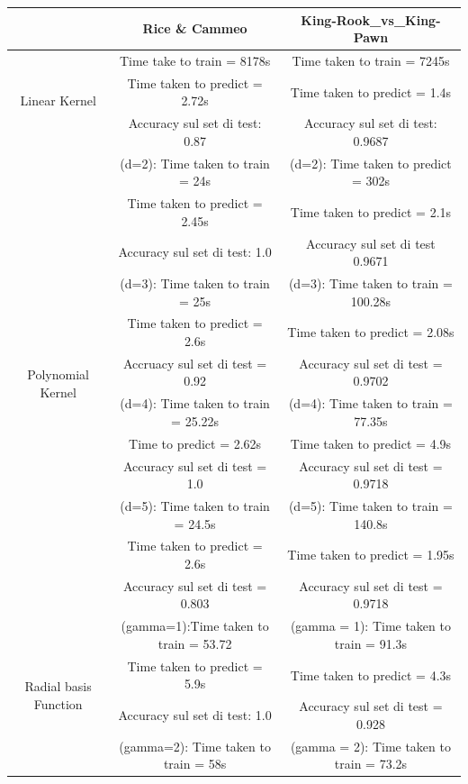\documentclass{article}
\begin{document}
  \begin{table}[htbp]
	\centering
	\begin{tabular}{|c|c|c|}
	  \hline
	  \multicolumn{1}{|c|}{} & \multicolumn{1}{c|}{Rice \& Cammeo} & \multicolumn{1}{c|}{King-Rook\_vs\_King-Pawn} \\
	  \hline
	  \multirow{3}{*}{Linear Kernel} & Time take to train = 8178s   & Time taken to train = 7245s\\
	  & Time taken to predict = 2.72s & Time taken to predict = 1.4s\\
	  & Accuracy sul set di test: 0.87 & Accuracy sul set di test: 0.9687\\
	  \hline
	  \multirow{12}{*}{Polynomial Kernel} & (d=2): Time taken to train = 24s & (d=2): Time taken to predict = 302s \\
	  & Time taken to predict = 2.45s & Time taken to predict = 2.1s\\
	  & Accuracy sul set di test: 1.0 & Accuracy sul set di test 0.9671\\
	  & (d=3): Time taken to train = 25s & (d=3): Time taken to train = 100.28s\\
	  & Time taken to predict = 2.6s & Time taken to predict = 2.08s\\
	  & Accruacy sul set di test = 0.92 & Accuracy sul set di test = 0.9702\\
	  & (d=4): Time taken to train = 25.22s & (d=4): Time taken to train = 77.35s\\
	  & Time to predict = 2.62s & Time taken to predict = 4.9s\\
	  & Accuracy sul set di test = 1.0 & Accuracy sul set di test = 0.9718\\
	  & (d=5): Time taken to train = 24.5s & (d=5): Time taken to train = 140.8s\\
	  & Time taken to predict = 2.6s & Time taken to predict = 1.95s\\
	  & Accuracy sul set di test = 0.803 & Accuracy sul set di test = 0.9718\\
	  \hline
	  \multirow{12}{*}{Radial basis Function} & (gamma=1):Time taken to train = 53.72 & (gamma = 1): Time taken to train = 91.3s\\
	  & Time taken to predict = 5.9s& Time taken to predict = 4.3s\\
	  & Accuracy sul set di test: 1.0 & Accuracy sul set di test = 0.928\\
	  & (gamma=2): Time taken to train = 58s & (gamma = 2): Time taken to train = 73.2s\\

\end{tabular}
\end{table}
\end{document}
